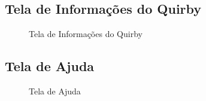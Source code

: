 \subsection{Tela de Informações do Quirby}
\begin{figure}[H]
\centering
{}
\caption{Tela de Informações do Quirby}
\end{figure}

\subsection{Tela de Ajuda}
\begin{figure}[H]
\centering
{}
\caption{Tela de Ajuda}
\end{figure}

